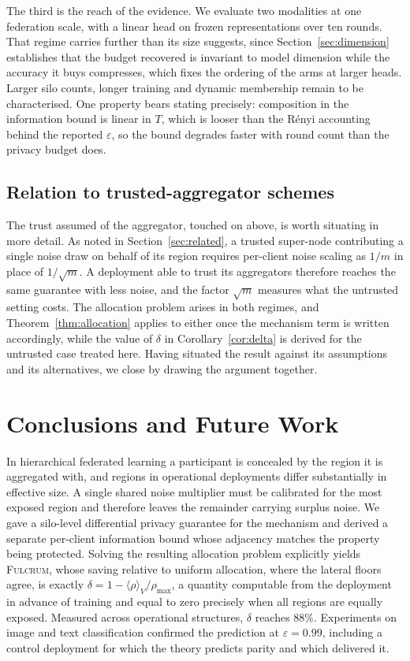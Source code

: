 \documentclass[acmsmall,screen,review,anonymous]{acmart}
\theoremstyle{acmdefinition}%
\newcommand{\Fulcrum}{\textsc{Fulcrum}\xspace}
\begin{document}
The third is the reach of the evidence. We evaluate two modalities at one federation scale,
with a linear head on frozen representations over ten rounds. That regime carries further
than its size suggests, since Section~\ref{sec:dimension} establishes that the budget
recovered is invariant to model dimension while the accuracy it buys compresses, which fixes
the ordering of the arms at larger heads. Larger silo counts, longer training and dynamic
membership remain to be characterised. One property bears stating precisely: composition in
the information bound is linear in $T$, which is looser than the R\'enyi accounting behind
the reported $\varepsilon$, so the bound degrades faster with round count than the privacy
budget does.

\subsection{Relation to trusted-aggregator schemes}

The trust assumed of the aggregator, touched on above, is worth situating in more detail. As noted in Section~\ref{sec:related}, a trusted super-node contributing a single
noise draw on behalf of its region requires per-client noise scaling as $1/m$ in
place of $1/\sqrt{m}$. A deployment able to trust its aggregators therefore
reaches the same guarantee with less noise, and the factor $\sqrt{m}$ measures
what the untrusted setting costs. The allocation problem arises in both regimes,
and Theorem~\ref{thm:allocation} applies to either once the mechanism term is
written accordingly, while the value of $\delta$ in Corollary~\ref{cor:delta} is
derived for the untrusted case treated here. Having situated the result against
its assumptions and its alternatives, we close by drawing the argument together.

\section{Conclusions and Future Work}
\label{sec:conclusion}

In hierarchical federated learning a participant is concealed by the region it is
aggregated with, and regions in operational deployments differ substantially in
effective size. A single shared noise multiplier must be calibrated for the most
exposed region and therefore leaves the remainder carrying surplus noise. We gave a silo-level differential privacy guarantee for the mechanism and derived a
separate per-client information bound whose adjacency matches the property being
protected. Solving the resulting allocation problem explicitly yields \Fulcrum, whose
saving relative to uniform allocation, where the lateral floors agree, is exactly
$\delta = 1 - \langle \rho \rangle_V / \rho_{\max}$, a
quantity computable from the deployment in advance of training and equal to zero
precisely when all regions are equally exposed.
Measured across operational structures, $\delta$ reaches $88\%$. Experiments on
image and text classification confirmed the prediction at $\varepsilon = 0.99$,
including a control deployment for which the theory predicts parity and which
delivered it.
\end{document}
